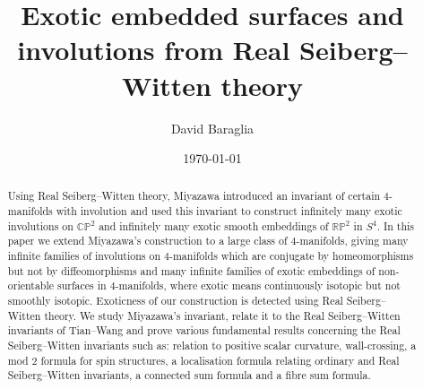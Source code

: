\documentclass{amsart}
\theoremstyle{definition}
\theoremstyle{remark}
\numberwithin{equation}{section}
\begin{document}
\setlength\parskip{0.5em plus 0.1em minus 0.2em}

\title[Exotic embedded surfaces and involutions]{Exotic embedded surfaces and involutions from Real Seiberg--Witten theory}
\author{David Baraglia}


\address{School of Mathematical Sciences, The University of Adelaide, Adelaide SA 5005, Australia}





\date{\today}


\begin{abstract}
Using Real Seiberg--Witten theory, Miyazawa introduced an invariant of certain $4$-manifolds with involution and used this invariant to construct infinitely many exotic involutions on $\mathbb{CP}^2$ and infinitely many exotic smooth embeddings of $\mathbb{RP}^2$ in $S^4$. In this paper we extend Miyazawa's construction to a large class of $4$-manifolds, giving many infinite families of  involutions on $4$-manifolds which are conjugate by homeomorphisms but not by diffeomorphisms and many infinite families of exotic embeddings of non-orientable surfaces in $4$-manifolds, where exotic means continuously isotopic but not smoothly isotopic. Exoticness of our construction is detected using Real Seiberg--Witten theory. We study Miyazawa's invariant, relate it to the Real Seiberg--Witten invariants of Tian--Wang and prove various fundamental results concerning the Real Seiberg--Witten invariants such as: relation to positive scalar curvature, wall-crossing, a mod $2$ formula for spin structures, a localisation formula relating ordinary and Real Seiberg--Witten invariants, a connected sum formula and a fibre sum formula.
\end{abstract}



\maketitle

\end{document}
